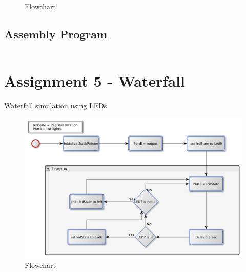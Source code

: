 \documentclass[a4paper, 12pt]{article}
\begin{document}
\begin{figure}[h]

\caption{Flowchart}
\label{}
\end{figure}

\subsection{Assembly Program}
\begin{lstlisting}

\end{lstlisting}
\newpage

\section{Assignment 5 - Waterfall}
\begin{algorithm}
\begin{algorithmic}
 
\Repeat
{}
\EndIf
{}
\EndIf
\Until{$\infty$}
\EndProcedure
\caption{Waterfall simulation using LEDs}
\label{}
\end{algorithmic}
\end{algorithm}

\begin{figure}[h]
\includegraphics[scale=0.5]{Flowchart_pics/assignment5_pic.png} 
\caption{Flowchart}
\label{}
\end{figure}
\newpage
\end{document}
